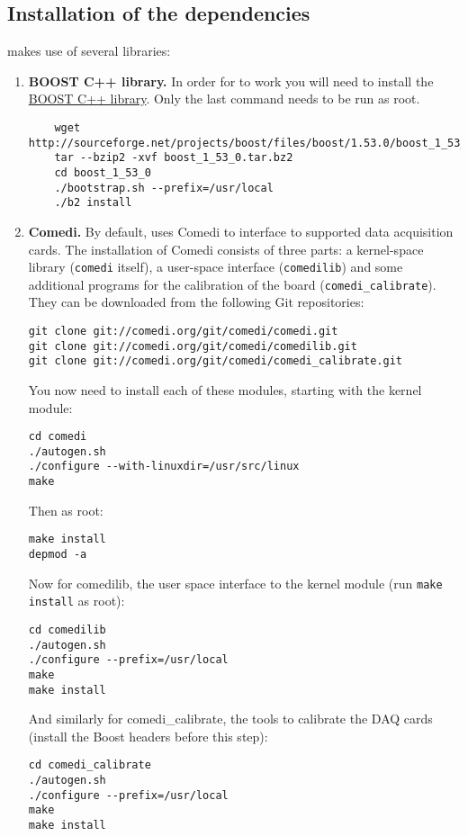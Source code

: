 \subsection{Installation of the dependencies}
\label{install:required}
\progname makes use of several libraries:
\begin{enumerate}
\item \textbf{BOOST C++ library.}
  In order for \progname to work you will need to install the
  \href{http://www.boost.org}{BOOST C++ library}. Only the last
  command needs to be run as root.
  \begin{lstlisting}
    wget http://sourceforge.net/projects/boost/files/boost/1.53.0/boost_1_53_0.tar.bz2
    tar --bzip2 -xvf boost_1_53_0.tar.bz2
    cd boost_1_53_0
    ./bootstrap.sh --prefix=/usr/local
    ./b2 install
  \end{lstlisting}
\item \textbf{Comedi.}
By default, \progname uses Comedi to interface to supported data
acquisition cards. The installation of Comedi consists of three parts:
a kernel-space library (\texttt{comedi} itself), a user-space
interface (\texttt{comedilib}) and some additional programs for the
calibration of the board (\texttt{comedi\_calibrate}). They can be
downloaded from the following Git repositories:
\begin{lstlisting}
git clone git://comedi.org/git/comedi/comedi.git
git clone git://comedi.org/git/comedi/comedilib.git
git clone git://comedi.org/git/comedi/comedi_calibrate.git
\end{lstlisting}
You now need to install each of these modules, starting with the kernel module:
\begin{lstlisting}
cd comedi
./autogen.sh
./configure --with-linuxdir=/usr/src/linux
make
\end{lstlisting}
Then as root:
\begin{lstlisting}
make install
depmod -a
\end{lstlisting}
Now for comedilib, the user space interface to the kernel module (run \texttt{make install} as root):
\begin{lstlisting}
cd comedilib
./autogen.sh
./configure --prefix=/usr/local
make
make install
\end{lstlisting}
And similarly for comedi\_calibrate, the tools to calibrate the DAQ cards (install the Boost headers before this step):
\begin{lstlisting}
cd comedi_calibrate
./autogen.sh
./configure --prefix=/usr/local
make
make install
\end{lstlisting}

\end{enumerate}
